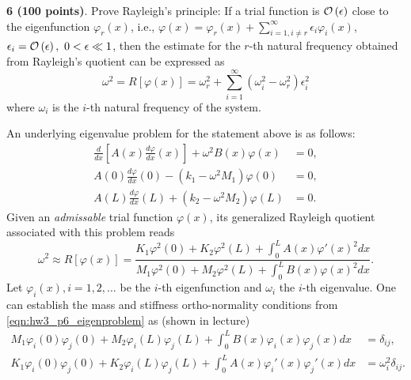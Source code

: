 \begin{problem}
    \textbf{6 (100 points)}. Prove Rayleigh's principle: 
    If a trial function is $\mathcal{O} \left( \epsilon \right)$ close to the eigenfunction $\varphi_r(x)$, i.e., $\varphi(x) = \varphi_r(x) + \sum_{i=1, i\neq r}^\infty \epsilon_i \varphi_i(x)$, $\epsilon_i = \mathcal{O} \left( \epsilon \right), ~0 < \epsilon \ll 1$, then the estimate for the $r$-th natural frequency obtained from Rayleigh's quotient can be expressed as 
    \begin{equation}\label{eqn:hw3_p6_rayleigh_principle}
        \omega^2 = R[\varphi(x)] = \omega_r^2 + \sum_{i=1}^{\infty} (\omega_i^2 - \omega_r^2) \epsilon_i^2
    \end{equation}
    where $\omega_i$ is the $i$-th natural frequency of the system.
\end{problem}
An underlying eigenvalue problem for the statement above is as follows: 
\begin{subequations}\label{eqn:hw3_p6_eigenproblem}
\begin{align}
    \frac{d}{dx} \left[A(x) \frac{d\varphi}{dx}(x) \right] + \omega^2 B(x) \varphi(x) &= 0, \\
    A(0) \frac{d\varphi}{dx}(0) - (k_1 - \omega^2 M_1) \varphi(0) &= 0, \\
    A(L) \frac{d\varphi}{dx}(L) + (k_2 - \omega^2 M_2) \varphi(L) &= 0.
\end{align}
\end{subequations}
Given an \emph{admissable} trial function $\varphi(x)$, its generalized Rayleigh quotient associated with this problem reads 
\begin{equation}\label{eqn:hw3_p6_rayleigh_quotient}
    \omega^2 \approx R[\varphi(x)] = \frac{K_1\varphi^2(0) + K_2 \varphi^2(L) + \int_0^L A(x) {\varphi'(x)}^2 dx}{M_1\varphi^2(0) + M_2 \varphi^2(L) + \int_0^L B(x) {\varphi(x)}^2 dx}.
\end{equation}
Let $\varphi_i(x), i = 1, 2, \ldots$ be the $i$-th eigenfunction and $\omega_i$ the $i$-th eigenvalue. 
One can establish the mass and stiffness ortho-normality conditions from \cref{eqn:hw3_p6_eigenproblem} as (shown in lecture)
\begin{subequations}\label{eqn:hw3_p6_orthonormality}
\begin{align}
    M_1\varphi_i(0) \varphi_j(0) + M_2\varphi_i(L) \varphi_j(L) + \int_0^L B(x) \varphi_i(x) \varphi_j(x) dx &= \delta_{ij}, \\
    K_1\varphi_i(0) \varphi_j(0) + K_2\varphi_i(L) \varphi_j(L) + \int_0^L A(x) \varphi_i'(x) \varphi_j'(x) dx &= \omega_i^2 \delta_{ij}.
\end{align}
\end{subequations}
